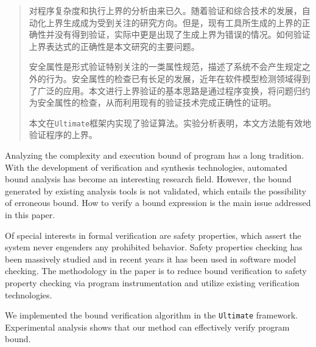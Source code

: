 

\begin{abstract}

    对程序复杂度和执行上界的分析由来已久。随着验证和综合技术的发展，自动化上界生成成为受到关注的研究方向。但是，现有工具所生成的上界的正确性并没有得到验证，实际中更是出现了生成上界为错误的情况。如何验证上界表达式的正确性是本文研究的主要问题。
    
    安全属性是形式验证特别关注的一类属性规范，描述了系统不会产生规定之外的行为。安全属性的检查已有长足的发展，近年在软件模型检测领域得到了广泛的应用。本文进行上界验证的基本思路是通过程序变换，将问题归约为安全属性的检查，从而利用现有的验证技术完成正确性的证明。
    
    本文在\texttt{Ultimate}框架内实现了验证算法。实验分析表明，本文方法能有效地验证程序的上界。

\end{abstract}

\begin{abstract*}
  Analyzing the complexity and execution bound of program has a long tradition. With the development of verification and synthesis technologies, automated bound analysis has become an interesting research field. However, the bound generated by existing analysis tools is not validated, which entails the possibility of erroneous bound. How to verify a bound expression is the main issue addressed in this paper.
  
  Of special interests in formal verification are safety properties, which assert the system never engenders any prohibited behavior. Safety properties checking has been massively studied and in recent years it has been used in software model checking. The methodology in the paper is to reduce bound verification to safety property checking via program instrumentation and utilize existing verification technologies.
  
  We implemented the bound verification algorithm in the \texttt{Ultimate} framework. Experimental analysis shows that our method can effectively verify program bound.

\end{abstract*}
